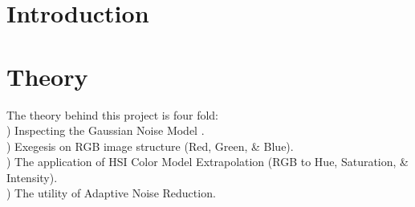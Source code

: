 \documentclass{article}
\begin{document}
\pagebreak

\tableofcontents


\pagebreak

\section{Introduction}

%	





\pagebreak

\section{Theory}

%
%



%
%
%
%

\noindent
The theory behind this project is four fold:\\
) Inspecting the Gaussian Noise Model .\\
) Exegesis on RGB image structure (Red, Green, \& Blue). \\
) The application of HSI Color Model Extrapolation (RGB to Hue, Saturation, \& Intensity).\\
) The utility of Adaptive Noise Reduction.
\end{document}
